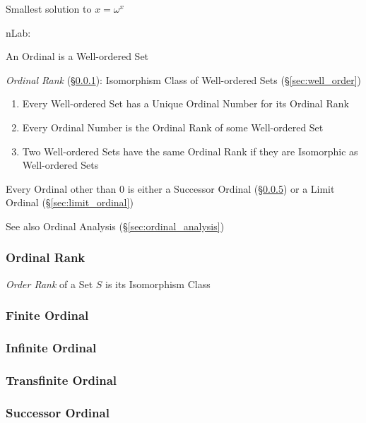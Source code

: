 Smallest solution to $x = \omega^x$

nLab:

An Ordinal is a Well-ordered Set

\emph{Ordinal Rank} (\S\ref{sec:ordinal_rank}): Isomorphism Class of
Well-ordered Sets (\S\ref{sec:well_order})

\begin{enumerate}
  \item Every Well-ordered Set has a Unique Ordinal Number for its
    Ordinal Rank
  \item Every Ordinal Number is the Ordinal Rank of some Well-ordered
    Set
  \item Two Well-ordered Sets have the same Ordinal Rank if they are
    Isomorphic as Well-ordered Sets
\end{enumerate}

Every Ordinal other than $0$ is either a Successor Ordinal
(\S\ref{sec:successor_ordinal}) or a Limit Ordinal
(\S\ref{sec:limit_ordinal})


\fist See also Ordinal Analysis (\S\ref{sec:ordinal_analysis})



\subsubsection{Ordinal Rank}\label{sec:ordinal_rank}

\emph{Order Rank} of a Set $S$ is its Isomorphism Class



\subsubsection{Finite Ordinal}\label{sec:finite_ordinal}

\subsubsection{Infinite Ordinal}\label{sec:infinite_ordinal}

\subsubsection{Transfinite Ordinal}\label{sec:transfinite_ordinal}

\subsubsection{Successor Ordinal}\label{sec:successor_ordinal}

